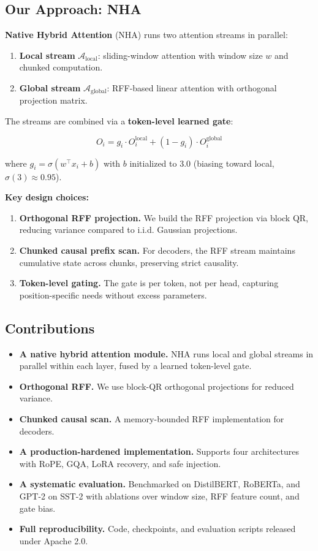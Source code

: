 \subsection{Our Approach: NHA}

\textbf{Native Hybrid Attention} (NHA) runs two attention streams in parallel:

\begin{enumerate}
\item \textbf{Local stream} $\mathcal{A}_\text{local}$: sliding-window attention with
  window size $w$ and chunked computation.
\item \textbf{Global stream} $\mathcal{A}_\text{global}$: RFF-based linear attention
  with orthogonal projection matrix.

\end{enumerate}
The streams are combined via a \textbf{token-level learned gate}:

\[
O_i = g_i \cdot O_i^\text{local} + (1 - g_i) \cdot O_i^\text{global}
\tag{1.1}
\]

where $g_i = \sigma(w^\top x_i + b)$ with $b$ initialized to $3.0$ (biasing 
toward local, $\sigma(3) \approx 0.95$).

\textbf{Key design choices:}

\begin{enumerate}
\item \textbf{Orthogonal RFF projection.} We build the RFF projection via block QR,
  reducing variance compared to i.i.d. Gaussian projections.
\item \textbf{Chunked causal prefix scan.} For decoders, the RFF stream maintains
  cumulative state across chunks, preserving strict causality.
\item \textbf{Token-level gating.} The gate is per token, not per head, capturing
  position-specific needs without excess parameters.

\end{enumerate}
\subsection{Contributions}

\begin{itemize}
\item \textbf{A native hybrid attention module.} NHA runs local and global streams in
  parallel within each layer, fused by a learned token-level gate.
\item \textbf{Orthogonal RFF.} We use block-QR orthogonal projections for reduced
  variance.
\item \textbf{Chunked causal scan.} A memory-bounded RFF implementation for decoders.
\item \textbf{A production-hardened implementation.} Supports four architectures
  with RoPE, GQA, LoRA recovery, and safe injection.
\item \textbf{A systematic evaluation.} Benchmarked on DistilBERT, RoBERTa, and GPT-2
  on SST-2 with ablations over window size, RFF feature count, and gate bias.
\item \textbf{Full reproducibility.} Code, checkpoints, and evaluation scripts released
  under Apache 2.0.

\end{itemize}
